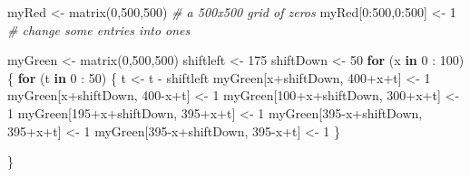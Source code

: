 \documentclass[
]{article}
\newenvironment{Shaded}{\begin{snugshade}}{\end{snugshade}}
\newcommand{\CommentTok}[1]{\textcolor[rgb]{0.56,0.35,0.01}{\textit{#1}}}
\newcommand{\ControlFlowTok}[1]{\textcolor[rgb]{0.13,0.29,0.53}{\textbf{#1}}}
\newcommand{\DecValTok}[1]{\textcolor[rgb]{0.00,0.00,0.81}{#1}}
\newcommand{\FunctionTok}[1]{\textcolor[rgb]{0.00,0.00,0.00}{#1}}
\newcommand{\NormalTok}[1]{#1}
\newcommand{\OtherTok}[1]{\textcolor[rgb]{0.56,0.35,0.01}{#1}}
\newcommand{\SpecialCharTok}[1]{\textcolor[rgb]{0.00,0.00,0.00}{#1}}
\begin{document}
\begin{Shaded}
\begin{Highlighting}[]
\NormalTok{myRed }\OtherTok{\textless{}{-}} \FunctionTok{matrix}\NormalTok{(}\DecValTok{0}\NormalTok{,}\DecValTok{500}\NormalTok{,}\DecValTok{500}\NormalTok{) }\CommentTok{\# a 500x500 grid of zeros}
\NormalTok{myRed[}\DecValTok{0}\SpecialCharTok{:}\DecValTok{500}\NormalTok{,}\DecValTok{0}\SpecialCharTok{:}\DecValTok{500}\NormalTok{] }\OtherTok{\textless{}{-}} \DecValTok{1} \CommentTok{\# change some entries into ones}

\NormalTok{myGreen }\OtherTok{\textless{}{-}} \FunctionTok{matrix}\NormalTok{(}\DecValTok{0}\NormalTok{,}\DecValTok{500}\NormalTok{,}\DecValTok{500}\NormalTok{)}
\NormalTok{shiftleft }\OtherTok{\textless{}{-}} \DecValTok{175}
\NormalTok{shiftDown }\OtherTok{\textless{}{-}} \DecValTok{50}
\ControlFlowTok{for}\NormalTok{ (x }\ControlFlowTok{in} \DecValTok{0} \SpecialCharTok{:} \DecValTok{100}\NormalTok{) \{}
  \ControlFlowTok{for}\NormalTok{ (t }\ControlFlowTok{in} \DecValTok{0} \SpecialCharTok{:} \DecValTok{50}\NormalTok{) \{}
\NormalTok{    t }\OtherTok{\textless{}{-}}\NormalTok{ t }\SpecialCharTok{{-}}\NormalTok{ shiftleft}
\NormalTok{    myGreen[x}\SpecialCharTok{+}\NormalTok{shiftDown, }\DecValTok{400}\SpecialCharTok{+}\NormalTok{x}\SpecialCharTok{+}\NormalTok{t] }\OtherTok{\textless{}{-}} \DecValTok{1}
\NormalTok{    myGreen[x}\SpecialCharTok{+}\NormalTok{shiftDown, }\DecValTok{400}\SpecialCharTok{{-}}\NormalTok{x}\SpecialCharTok{+}\NormalTok{t] }\OtherTok{\textless{}{-}} \DecValTok{1}
\NormalTok{    myGreen[}\DecValTok{100}\SpecialCharTok{+}\NormalTok{x}\SpecialCharTok{+}\NormalTok{shiftDown, }\DecValTok{300}\SpecialCharTok{+}\NormalTok{x}\SpecialCharTok{+}\NormalTok{t] }\OtherTok{\textless{}{-}} \DecValTok{1}
\NormalTok{    myGreen[}\DecValTok{195}\SpecialCharTok{+}\NormalTok{x}\SpecialCharTok{+}\NormalTok{shiftDown, }\DecValTok{395}\SpecialCharTok{+}\NormalTok{x}\SpecialCharTok{+}\NormalTok{t] }\OtherTok{\textless{}{-}} \DecValTok{1}
\NormalTok{    myGreen[}\DecValTok{395}\SpecialCharTok{{-}}\NormalTok{x}\SpecialCharTok{+}\NormalTok{shiftDown, }\DecValTok{395}\SpecialCharTok{+}\NormalTok{x}\SpecialCharTok{+}\NormalTok{t] }\OtherTok{\textless{}{-}} \DecValTok{1}
\NormalTok{    myGreen[}\DecValTok{395}\SpecialCharTok{{-}}\NormalTok{x}\SpecialCharTok{+}\NormalTok{shiftDown, }\DecValTok{395}\SpecialCharTok{{-}}\NormalTok{x}\SpecialCharTok{+}\NormalTok{t] }\OtherTok{\textless{}{-}} \DecValTok{1}
\NormalTok{  \}}

\NormalTok{\}}


\end{Highlighting}
\end{Shaded}
\end{document}
